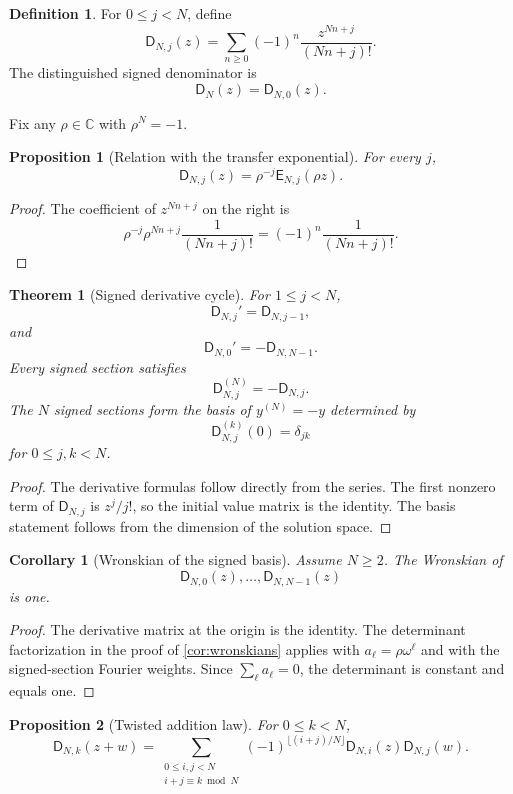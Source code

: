 \documentclass[11pt,letterpaper]{article}
\newtheorem{theorem}{Theorem}[section]
\newtheorem{proposition}[proposition]{Proposition}
\newtheorem{corollary}[corollary]{Corollary}
\theoremstyle{definition}
\newtheorem{definition}[definition]{Definition}
\theoremstyle{remark}
\newcommand{\CC}{\mathbb C}
\newcommand{\Dfun}{\mathsf D}
\newcommand{\Efun}{\mathsf E}
\begin{document}
\begin{definition}\label{def:signed_sections}
For $0\leq j<N$, define
\[
\Dfun_{N,j}(z)
=
\sum_{n\geq0}(-1)^n\frac{z^{Nn+j}}{(Nn+j)!}.
\]
The distinguished signed denominator is
\[
\Dfun_N(z)=\Dfun_{N,0}(z).
\]
\end{definition}

Fix any $\rho\in\CC$ with $\rho^N=-1$.

\begin{proposition}[Relation with the transfer exponential]\label{prop:signed_exponential_relation}
For every $j$,
\[
\Dfun_{N,j}(z)
=
\rho^{-j}\Efun_{N,j}(\rho z).
\]
\end{proposition}

\begin{proof}
The coefficient of $z^{Nn+j}$ on the right is
\[
\rho^{-j}\rho^{Nn+j}\frac1{(Nn+j)!}
=
(-1)^n\frac1{(Nn+j)!}.
\]
\end{proof}

\begin{theorem}[Signed derivative cycle]\label{thm:signed_cycle}
For $1\leq j<N$,
\[
\Dfun_{N,j}'=\Dfun_{N,j-1},
\]
and
\[
\Dfun_{N,0}'=-\Dfun_{N,N-1}.
\]
Every signed section satisfies
\[
\Dfun_{N,j}^{(N)}=-\Dfun_{N,j}.
\]
The $N$ signed sections form the basis of $y^{(N)}=-y$ determined by
\[
\Dfun_{N,j}^{(k)}(0)=\delta_{jk}
\]
for $0\leq j,k<N$.
\end{theorem}

\begin{proof}
The derivative formulas follow directly from the series.  The first nonzero term of $\Dfun_{N,j}$ is $z^j/j!$, so the initial value matrix is the identity.  The basis statement follows from the dimension of the solution space.
\end{proof}

\begin{corollary}[Wronskian of the signed basis]\label{cor:signed_wronskian}
Assume $N\geq2$. The Wronskian of
\[
\Dfun_{N,0}(z),\ldots,\Dfun_{N,N-1}(z)
\]
is one.
\end{corollary}

\begin{proof}
The derivative matrix at the origin is the identity. The determinant
factorization in the proof of \cref{cor:wronskians} applies with
$a_\ell=\rho\omega^\ell$ and with the signed-section Fourier weights.
Since $\sum_\ell a_\ell=0$, the determinant is constant and equals one.
\end{proof}


\begin{proposition}[Twisted addition law]\label{prop:signed_addition}
For $0\leq k<N$,
\[
\Dfun_{N,k}(z+w)
=
\sum_{\substack{0\leq i,j<N\\ i+j\equiv k\bmod N}}
(-1)^{\lfloor(i+j)/N\rfloor}
\Dfun_{N,i}(z)\Dfun_{N,j}(w).
\]
\end{proposition}
\end{document}
